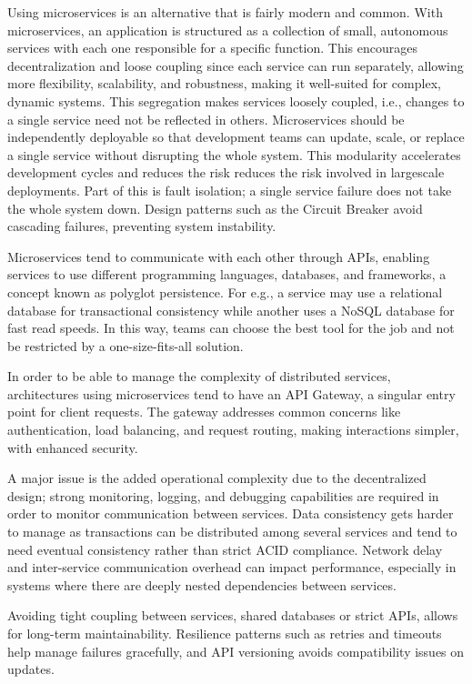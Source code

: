 \documentclass[]{final}
\begin{document}
Using microservices is an alternative that is fairly modern and common.
With microservices, an application is structured as a collection of small,
autonomous services with each one responsible for a specific function. This encourages decentralization
and loose coupling since each service can run separately, allowing more flexibility,
scalability, and robustness, making it well-suited for complex, dynamic systems.
This segregation makes services loosely coupled, i.e., changes to a single service need not be reflected in others.
Microservices should be independently deployable so that development teams can update,
scale, or replace a single service without disrupting the whole system. This
modularity accelerates development cycles and reduces the risk reduces the
risk involved in largescale deployments. Part of this is fault isolation; a
single service failure does not take the whole system down.
Design patterns such as the Circuit Breaker avoid cascading failures, preventing system instability.

Microservices tend to communicate with each other through APIs, enabling
services to use different programming languages, databases, and frameworks,
a concept known as polyglot persistence. For e.g., a service may use
a relational database for transactional consistency while another uses a NoSQL
database for fast read speeds. In this way,
teams can choose the best tool for the job and not be restricted by
a one-size-fits-all solution.

In order to be able to manage the complexity of distributed services, architectures using microservices
tend to have an API Gateway, a singular entry point for client requests. The gateway addresses
common concerns like authentication, load balancing, and request routing, making interactions simpler,
with enhanced security.

A major issue is the added operational complexity due to the decentralized
design; strong monitoring, logging, and debugging capabilities are required in
order to monitor communication between services.
Data consistency gets harder to manage as transactions can be distributed among
several services and tend to need eventual consistency rather than strict ACID
compliance. Network delay and inter-service communication overhead can impact
performance, especially in systems where there are deeply nested dependencies
between services.

Avoiding tight coupling between services, shared databases or strict
APIs, allows for long-term maintainability. Resilience patterns
such as retries and timeouts help manage failures gracefully,
and API versioning avoids compatibility issues on updates.
\end{document}
